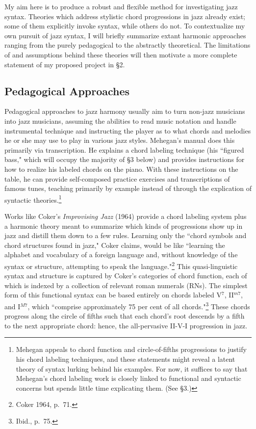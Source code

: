 My aim here is to produce a robust and flexible method for investigating jazz syntax.  Theories which address stylistic chord progressions in jazz already exist; some of them explicitly invoke syntax, while others do not.  To contextualize my own pursuit of jazz syntax, I will briefly summarize extant harmonic approaches ranging from the purely pedagogical to the abstractly theoretical.  The limitations of and assumptions behind these theories will then motivate a more complete statement of my proposed project in \S 2.

\subsection{Pedagogical Approaches}
Pedagogical approaches to jazz harmony usually aim to turn non-jazz musicians into jazz musicians, assuming the abilities to read music notation and handle instrumental technique and instructing the player as to what chords and melodies he or she may use to play in various jazz styles.  Mehegan's manual does this primarily via transcription.  He explains a chord labeling technique (his ``figured bass," which will occupy the majority of \S 3 below) and provides instructions for how to realize his labeled chords on the piano.  With these instructions on the table, he can provide self-composed practice exercises and transcriptions of famous tunes, teaching primarily by example instead of through the explication of syntactic theories.\footnote{Mehegan appeals to chord function and circle-of-fifths progressions to justify his chord labeling techniques, and these statements might reveal a latent theory of syntax lurking behind his examples.  For now, it suffices to say that Mehegan's chord labeling work is closely linked to functional and syntactic concerns but spends little time explicating them.  (See \S 3.)}

Works like Coker's \emph{Improvising Jazz} (1964) provide a chord labeling system plus a harmonic theory meant to summarize which kinds of progressions show up in jazz and distill them down to a few rules.  Learning only the ``chord symbols and chord structures found in jazz," Coker claims, would be like ``learning the alphabet and vocabulary of a foreign language and, without knowledge of the syntax or structure, attempting to speak the language."\footnote{Coker 1964, p.\ 71.}  This quasi-linguistic syntax and structure is captured by Coker's categories of chord function, each of which is indexed by a collection of relevant roman numerals (RNs).  The simplest form of this functional syntax can be based entirely on chords labeled V$^{7}$, II$^{m7}$, and I$^{M7}$, which ``comprise approximately 75 per cent of all chords."\footnote{Ibid., p.\ 75.}  These chords progress along the circle of fifths such that each chord's root descends by a fifth to the next appropriate chord: hence, the all-pervasive II-V-I progression in jazz.


